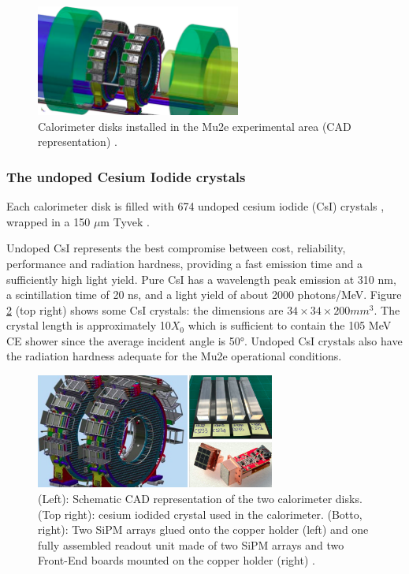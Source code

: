 \begin{figure}[!h]
    \centering
    \includegraphics[width =0.6\textwidth]{figures/png/Screenshot_20240322_122050.png}
    \caption[CAD representation of the calorimeter disks.]{Calorimeter disks installed in the Mu2e experimental area (CAD representation) \cite{em7}.}
    \label{fig:calo1}
\end{figure}



\subsubsection{The undoped Cesium Iodide crystals}
Each calorimeter disk is filled with 674 undoped cesium 
iodide (CsI) crystals \cite{em6}, wrapped in a 150 $\mu$m Tyvek .

Undoped CsI represents the best compromise between cost, 
reliability, performance and radiation hardness, providing 
a fast emission time and a sufficiently high light yield. Pure 
CsI has a wavelength peak emission at 310 nm, a scintillation 
time of 20 ns, and a light yield of about 2000 photons/MeV. 
Figure \ref{fig:calo2} (top right) shows some CsI crystals: 
the dimensions are $34 \times 34 \times 200 mm^3$. The crystal length 
is approximately 10$X_0$ which is sufficient to contain the 105 
MeV CE shower since the average incident angle 
is 50°. Undoped CsI crystals also have the radiation hardness 
adequate for the Mu2e operational conditions. 




\begin{figure}[!h]
    \centering
    \includegraphics[width =0.7\textwidth]{figures/png/Screenshot_20240322_121000.png}
    \caption[The calorimeter components.]{(Left): Schematic CAD representation of the two calorimeter disks. (Top right): 
    cesium iodided crystal used in the calorimeter. (Botto, right): Two SiPM arrays 
    glued onto the copper holder (left) and one fully assembled readout unit made of two 
    SiPM arrays and two Front-End boards mounted on the copper holder (right) \cite{em4}.}
    \label{fig:calo2}
\end{figure}



